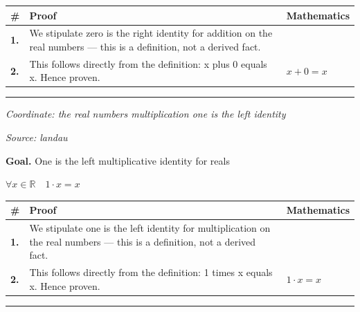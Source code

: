 \documentclass[11pt]{article}
\theoremstyle{definition}
\begin{document}
\medskip
\noindent
\begin{tabular}{@{} >{\raggedright\arraybackslash}p{} >{\raggedright\arraybackslash}p{} >{\raggedleft\arraybackslash}p{} @{}}
\textbf{\#} & \textbf{Proof} & \textbf{Mathematics} \\
\midrule
\textbf{1.} & We stipulate zero is the right identity for addition on the real numbers — this is a definition, not a derived fact. & \\[0.45em]
\textbf{2.} & This follows directly from the definition: x plus 0 equals x. Hence proven. & $\displaystyle x + 0 = x$ \\[0.45em]
\bottomrule
\end{tabular}
\label{thm:Real-addition-zero_is_the_right_identity}
\par\medskip\hrule
\bigskip
{}\par
\smallskip\noindent\textit{Coordinate: the real numbers \cdot multiplication \cdot one is the left identity}\par
\smallskip\noindent\textit{Source: landau}\par
\medskip
\noindent\textbf{Goal.} One is the left multiplicative identity for reals\par
\noindent$\displaystyle \forall x \in \mathbb{R}\quad 1 \cdot x = x$\par
\medskip
\noindent
\begin{tabular}{@{} >{\raggedright\arraybackslash}p{} >{\raggedright\arraybackslash}p{} >{\raggedleft\arraybackslash}p{} @{}}
\textbf{\#} & \textbf{Proof} & \textbf{Mathematics} \\
\midrule
\textbf{1.} & We stipulate one is the left identity for multiplication on the real numbers — this is a definition, not a derived fact. & \\[0.45em]
\textbf{2.} & This follows directly from the definition: 1 times x equals x. Hence proven. & $\displaystyle 1 \cdot x = x$ \\[0.45em]
\bottomrule
\end{tabular}
\label{thm:Real-multiplication-one_is_the_left_identity}
\par\medskip\hrule
\end{document}
